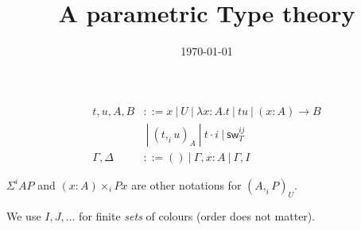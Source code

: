 \documentclass[10pt,a4paper]{article}
\title{A parametric Type theory}
\author{}
\date{\today}
\newcommand\CC[4]{(#2,_{#1} #3)_{#4}}
\newcommand\CSig[1]{\Sigma^{#1}}
\newcommand\sw[2]{\mathsf{sw}^{#1}_{#2}}
\newcommand\param[1]{\!\cdot\!#1}
\begin{document}
\maketitle


\begin{definition}
  
  \begin{align*}
    t,u,A,B & ::= x ~|~ U ~|~ λx:A. t      ~|~ t u ~|~ (x:A) → B \\
            & ~|~ \CC i t u A  ~|~ t \param i ~|~ \sw {ij} T \\
    \Gamma,\Delta & ::= () ~|~ \Gamma,x:A ~|~ \Gamma,I 
  \end{align*}
\end{definition}
$\CSig i A P$ and $(x:A) ×_i P x$ are other notations for $(A ,_i P)_U$.

 We use $I,J,…$ for finite {\em sets} of colours (order does not matter).
\end{document}
